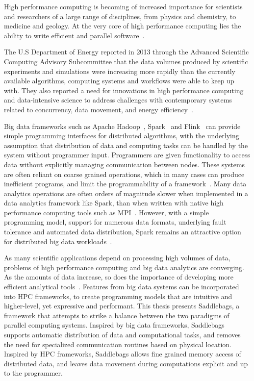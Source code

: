 \documentclass{uit-report}
\begin{document}
High performance computing is becoming of increased importance for scientists and researchers of a large range of disciplines, from physics and chemistry, to medicine and geology. At the very core of high performance computing lies the ability to write efficient and parallel software~\cite{engineering}.

The U.S Department of Energy reported in 2013 through the Advanced Scientific Computing Advisory Subcommittee that the data volumes produced by scientific experiments and simulations were increasing more rapidly than the currently available algorithms, computing systems and workflows were able to keep up with. They also reported a need for innovations in high performance computing and data-intensive science to address challenges with contemporary systems related to concurrency, data movement, and energy efficiency~\cite{subcommittee}.

Big data frameworks such as Apache Hadoop~\cite{hadoop}, Spark~\cite{spark} and Flink~\cite{flink} can provide simple programming interfaces for distributed algorithms, with the underlying assumption that distribution of data and computing tasks can be handled by the system without programmer input. Programmers are given functionality to access data without explicitly managing communication between nodes. These systems are often reliant on coarse grained operations, which in many cases can produce inefficient programs, and limit the programmability of a framework~\cite{husky}\cite{piccolo}. Many data analytics operations are often orders of magnitude slower when implemented in a data analytics framework like Spark, than when written with native high performance computing tools such as MPI~\cite{bridgingthegap}. However, with a simple programming model, support for numerous data formats, underlying fault tolerance and automated data distribution, Spark remains an attractive option for distributed big data workloads~\cite{sparkarticle}. 

As many scientific applications depend on processing high volumes of data, problems of high performance computing and big data analytics are converging. As the amounts of data increase, so does the importance of developing more efficient analytical tools~\cite{hpcabds}. Features from big data systems can be incorporated into HPC frameworks, to create programming models that are intuitive and higher-level, yet expressive and performant. This thesis presents Saddlebags, a framework that attempts to strike a balance between the two paradigms of parallel computing systems. Inspired by big data frameworks, Saddlebags supports automatic distribution of data and computational tasks, and removes the need for specialized communication routines based on physical location. Inspired by HPC frameworks, Saddlebags allows fine grained memory access of distributed data, and leaves data movement during computations explicit and up to the programmer.
\end{document}
